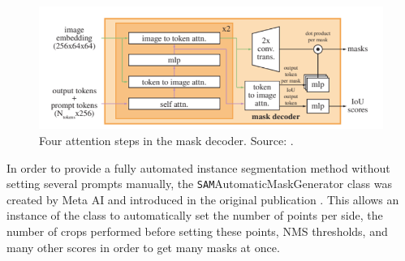 \begin{figure}
	\centering
	\includegraphics[width=\textwidth]{"images/maskdecoder.png"}
	\caption[\texttt{SAM} mask decoder]{Four attention steps in the mask decoder. Source: \cite{kirillov2023segment}.}
	\label{figdecoder}
\end{figure}

In order to provide a fully automated instance segmentation method without setting several prompts manually, the \texttt{SAM}AutomaticMaskGenerator class was created by Meta AI and introduced in the original publication \cite{kirillov2023segment}. This allows an instance of the class to automatically set the number of points per side, the number of crops performed before setting these points, NMS thresholds, and many other scores in order to get many masks at once.